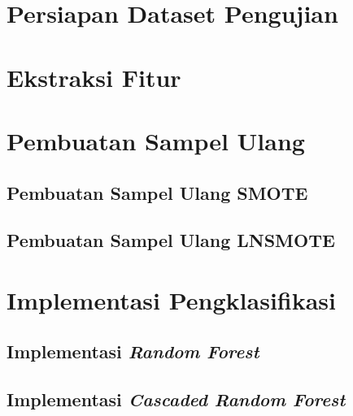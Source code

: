 \documentclass[12pt,a4paper,titlepage]{report}
\begin{document}
	\section{Persiapan Dataset Pengujian}
	\label{bab:03:persiapan_data_pengujian}
	

	\section{Ekstraksi Fitur}
	\label{bab:03:ekstraksi_fitur}
	

	\section{Pembuatan Sampel Ulang}
	\label{bab:03:pembuatan_sampel_ulang}
	

	\subsection{Pembuatan Sampel Ulang SMOTE}
	\label{bab:03:sampel_ulang_smote}
	
\newpage
	

\newpage
	\subsection{Pembuatan Sampel Ulang LNSMOTE}
	\label{bab:03:sampel_ulang_lnsmote}
	
	

\newpage
	\section{Implementasi Pengklasifikasi}
	

	\subsection{Implementasi \textit{Random Forest}}
	\label{subsection:implementasi_rf}
	
	

	\subsection{Implementasi \textit{Cascaded Random Forest}}
	\label{subsection:implementasi_crf}
	
\end{document}
